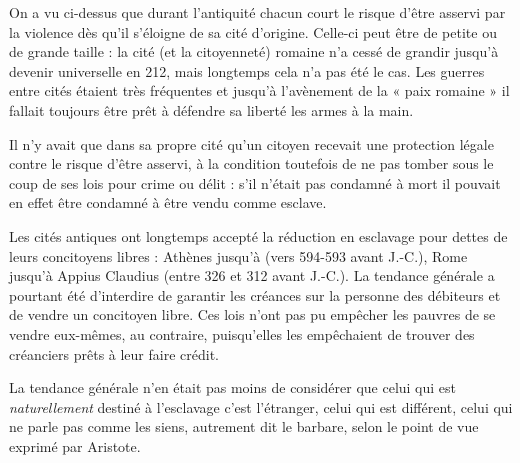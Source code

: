 On a vu ci-dessus que durant l'antiquité chacun court le risque
d'être asservi par la violence dès qu'il s'éloigne de sa cité d'origine. Celle-ci
peut être de petite ou de grande taille : la cité (et la citoyenneté) romaine
n'a cessé de grandir jusqu'à devenir universelle en 212, mais longtemps
cela n'a pas été le cas. Les guerres entre cités étaient très fréquentes
et jusqu'à l'avènement de la « paix romaine » il fallait toujours être prêt
à défendre sa liberté les armes à la main.

Il n'y avait que dans sa propre cité qu'un citoyen recevait une protection
légale contre le risque d'être asservi, à la condition toutefois de ne
pas tomber sous le coup de ses lois pour crime ou délit : s'il n'était pas
condamné à mort il pouvait en effet être condamné à être vendu comme
esclave.

Les cités antiques ont longtemps accepté la réduction en esclavage
pour dettes de leurs concitoyens libres : Athènes jusqu'à  (vers
594-593 avant J.-C.), Rome jusqu'à \hbox{Appius} Claudius  (entre 326 et 312
avant J.-C.). La tendance générale a pourtant été d'interdire de garantir
les créances sur la personne des débiteurs et de vendre un concitoyen libre.
Ces lois n'ont pas pu empêcher les pauvres de se vendre eux-mêmes,
au contraire, puisqu'elles les empêchaient de trouver des créanciers prêts
à leur faire crédit.

La tendance générale%
n'en était pas moins de considérer que celui
qui est \emph{naturellement} destiné à l'esclavage c'est l'étranger, celui qui est différent,
celui qui ne parle pas comme les siens, autrement dit le barbare, selon
le point de vue exprimé par Aristote.